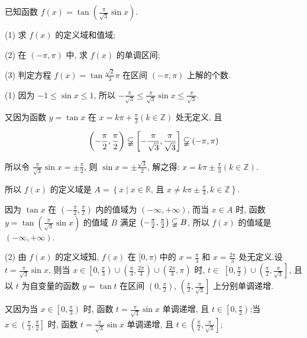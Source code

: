 \begin{example}
	已知函数 $f(x)=\tan \left(\frac{\pi}{\sqrt{3}} \sin x\right)$.

	(1) 求 $f(x)$ 的定义域和值域;

	(2) 在 $(-\pi, \pi)$ 中, 求 $f(x)$ 的单调区间;

	(3) 判定方程 $f(x)=\tan \frac{\sqrt{2}}{3} \pi$ 在区间 $(-\pi, \pi)$ 上解的个数.
\end{example}
\begin{solution}
	(1) 因为 $-1 \leqslant \sin x \leqslant 1$, 所以 $-\frac{\pi}{\sqrt{3}} \leqslant \frac{\pi}{\sqrt{3}} \sin x \leqslant \frac{\pi}{\sqrt{3}}$.

	又因为函数 $y=\tan x$ 在 $x=k \pi+\frac{\pi}{2}(k \in \mathbb{Z})$ 处无定义, 且

	$$
		\left(-\frac{\pi}{2}, \frac{\pi}{2}\right) \varsubsetneqq\left[-\frac{\pi}{\sqrt{3}}, \frac{\pi}{\sqrt{3}}\right] \varsubsetneqq(-\pi, \pi)
	$$

	所以令 $\frac{\pi}{\sqrt{3}} \sin x= \pm \frac{\pi}{2}$, 则 $\sin x= \pm \frac{\sqrt{3}}{2}$, 解之得: $x=k \pi \pm \frac{\pi}{3}(k \in \mathbb{Z})$.

	所以 $f(x)$ 的定义域是 $A=\left\{x \mid x \in \mathbb{R}\right.$, 且 $\left.x \neq k \pi \pm \frac{\pi}{3}, k \in \mathbb{Z}\right\}$.

	因为 $\tan x$ 在 $\left(-\frac{\pi}{2}, \frac{\pi}{2}\right)$ 内的值域为 $(-\infty,+\infty)$, 而当 $x \in A$ 时, 函数 $y=\tan \left(\frac{\pi}{\sqrt{3}} \sin x\right)$ 的值域 $B$ 满足 $\left(-\frac{\pi}{2}, \frac{\pi}{2}\right) \varsubsetneqq B$, 所以 $f(x)$ 的值域是 $(-\infty,+\infty)$.

	(2) 由 $f(x)$ 的定义域知, $f(x)$ 在 $[0, \pi)$ 中的 $x=\frac{\pi}{3}$ 和 $x=\frac{2 \pi}{3}$ 处无定义.设 $t=\frac{\pi}{\sqrt{3}} \sin x$, 则当 $x \in\left[0, \frac{\pi}{3}\right) \cup\left(\frac{\pi}{3}, \frac{2 \pi}{3}\right) \cup\left(\frac{2 \pi}{3}, \pi\right)$ 时, $t \in$ $\left[0, \frac{\pi}{2}\right) \cup\left(\frac{\pi}{2}, \frac{\pi}{\sqrt{3}}\right]$, 且以 $t$ 为自变量的函数 $y=\tan t$ 在区间 $\left(0, \frac{\pi}{2}\right)$, $\left(\frac{\pi}{2}, \frac{\pi}{\sqrt{3}}\right]$ 上分别单调递增.

				又因为当 $x \in\left[0, \frac{\pi}{3}\right)$ 时, 函数 $t=\frac{\pi}{\sqrt{3}} \sin x$ 单调递增, 且 $t \in\left[0, \frac{\pi}{2}\right)$;当 $x \in\left(\frac{\pi}{3}, \frac{\pi}{2}\right]$ 时, 函数 $t=\frac{\pi}{\sqrt{3}} \sin x$ 单调递增, 且 $t \in\left(\frac{\pi}{2}, \frac{\pi}{\sqrt{3}}\right]$;


\end{solution}
